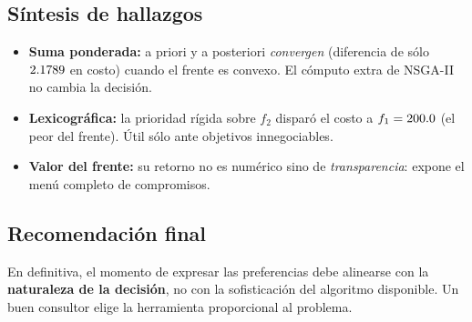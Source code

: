\subsection{Síntesis de hallazgos}

\begin{itemize}[noitemsep]
  \item \textbf{Suma ponderada:} a priori y a posteriori \emph{convergen}
        (diferencia de sólo $\num{2.1789}$ en costo) cuando el frente
        es convexo. El cómputo extra de NSGA-II no cambia la decisión.
  \item \textbf{Lexicográfica:} la prioridad rígida sobre $f_2$ disparó el
        costo a $f_1 = \num{200.0}$ (el peor del frente). Útil sólo
        ante objetivos innegociables.
  \item \textbf{Valor del frente:} su retorno no es numérico sino de
        \emph{transparencia}: expone el menú completo de compromisos.
\end{itemize}

\subsection{Recomendación final}

\begin{center}
\end{center}

En definitiva, el momento de expresar las preferencias debe alinearse con la
\textbf{naturaleza de la decisión}, no con la sofisticación del algoritmo
disponible. Un buen consultor elige la herramienta proporcional al problema.
